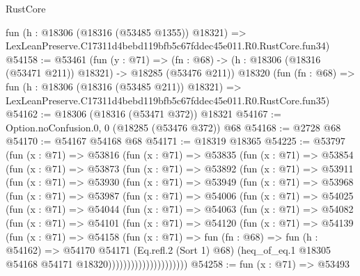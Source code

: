 \begin{lexlean}{RustCore}
\begin{coremodule}
    fun (h : @18306 (@18316 (@53485 @1355)) @18321) =>
    LexLeanPreserve.C17311d4bebd119bfb5c67fddec45e011.R0.RustCore.fun34)
@54158 := @53461
    (fun (y : @71) =>
    (fn : @68) -> (h : @18306 (@18316 (@53471 @211)) @18321) -> @18285 (@53476 @211))
    @18320
    (fun (fn : @68) =>
    fun (h : @18306 (@18316 (@53485 @211)) @18321) =>
    LexLeanPreserve.C17311d4bebd119bfb5c67fddec45e011.R0.RustCore.fun35)
@54162 := @18306 (@18316 (@53471 @372)) @18321
@54167 := Option.noConfusion.{0, 0} (@18285 (@53476 @372)) @68
@54168 := @2728 @68
@54170 := @54167 @54168 @68
@54171 := @18319 @18365
@54225 := @53797
    (fun (x : @71) =>
    @53816
      (fun (x : @71) =>
      @53835
        (fun (x : @71) =>
        @53854
          (fun (x : @71) =>
          @53873
            (fun (x : @71) =>
            @53892
              (fun (x : @71) =>
              @53911
                (fun (x : @71) =>
                @53930
                  (fun (x : @71) =>
                  @53949
                    (fun (x : @71) =>
                    @53968
                      (fun (x : @71) =>
                      @53987
                        (fun (x : @71) =>
                        @54006
                          (fun (x : @71) =>
                          @54025
                            (fun (x : @71) =>
                            @54044
                              (fun (x : @71) =>
                              @54063
                                (fun (x : @71) =>
                                @54082
                                  (fun (x : @71) =>
                                  @54101
                                    (fun (x : @71) =>
                                    @54120
                                      (fun (x : @71) =>
                                      @54139
                                        (fun (x : @71) =>
                                        @54158
                                          (fun (x : @71) =>
                                          fun (fn : @68) =>
                                          fun (h : @54162) =>
                                          @54170
                                            @54171
                                            (Eq.refl.{2} (Sort 1) @68)
                                            (heq_of_eq.{1}
                                              @18305
                                              @54168
                                              @54171
                                              @18320)))))))))))))))))))))
@54258 := fun (x : @71) =>
  @53493

\end{coremodule}
\end{lexlean}
